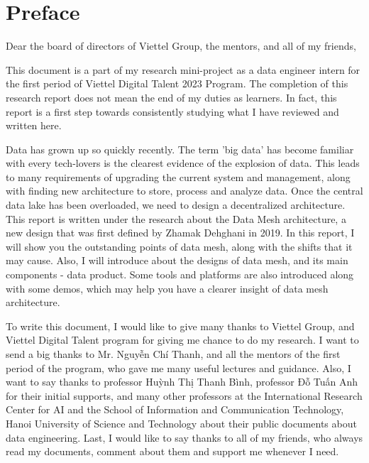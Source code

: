 \documentclass[12pt, a4paper]{book}
\begin{document}
 
	
    \raggedbottom
    \clearpage
    \thispagestyle{empty}
    
    \begingroup
    \normalsize
    

\chapter*{Preface}
{}

\justifying
{}
Dear the board of directors of Viettel Group, the mentors, and all of my friends,

This document is a part of my research mini-project as a data engineer intern for the first period of Viettel Digital Talent 2023 Program. The completion of this research report does not mean the end of my duties as learners. In fact, this report is a first step towards consistently studying what I have reviewed and written here.

Data has grown up so quickly recently. The term 'big data' has become familiar with every tech-lovers is the clearest evidence of the explosion of data. This leads to many requirements of upgrading the current system and management, along with finding new architecture to store, process and analyze data. Once the central data lake has been overloaded, we need to design a decentralized architecture. This report is written under the research about the Data Mesh architecture, a new design that was first defined by Zhamak Dehghani in 2019. In this report, I will show you the outstanding points of data mesh, along with the shifts that it may cause. Also, I will introduce about the designs of data mesh, and its main components - data product. Some tools and platforms are also introduced along with some demos, which may help you have a clearer insight of data mesh architecture.

To write this document, I would like to give many thanks to Viettel Group, and Viettel Digital Talent program for giving me chance to do my research. I want to send a big thanks to Mr. Nguyễn Chí Thanh, and all the mentors of the first period of the program, who gave me many useful lectures and guidance. Also, I want to say thanks to professor Huỳnh Thị Thanh Bình, professor Đỗ Tuấn Anh for their initial supports, and many other professors at the International Research Center for AI and the School of Information and Communication Technology, Hanoi University of Science and Technology about their public documents about data engineering. Last, I would like to say thanks to all of my friends, who always read my documents, comment about them and support me whenever I need.
\end{document}

